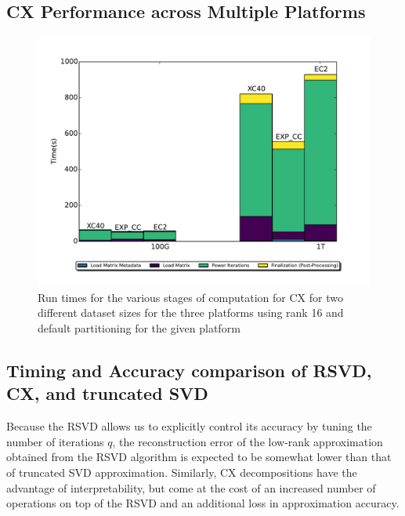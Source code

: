   \subsection{CX Performance across Multiple Platforms}
  \label{sect:h2h}
    
    \begin{figure} [h!btp]
    \begin{centering}
    \includegraphics[scale=0.4]{images/CX_Size_Scaling_New_Colors_Axes_Rank_16_Partitions_default.pdf}
    \end{centering}
    \caption{ Run times for the various stages of computation for CX for two different dataset sizes for the three platforms using rank 16 and default partitioning for the given platform} 
    \label{fig:h2hrank16} 
    \end{figure}

    
  

  
  \subsection{Timing and Accuracy comparison of RSVD, CX, and truncated SVD}

 Because the RSVD allows us to explicitly control its accuracy by tuning the number of iterations $q$,
 the reconstruction error of the low-rank approximation obtained from the RSVD
 algorithm is expected to be somewhat lower than that of truncated SVD
 approximation. Similarly, CX decompositions have the advantage of
 interpretability, but come at the cost of an increased number of operations on
 top of the RSVD and an additional loss in approximation accuracy. 

